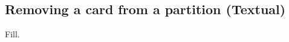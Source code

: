 \newpage
\subsection{Removing a card from a partition (Textual)}
\texHeader
\hypertarget{remCard tex}{}

Fill.